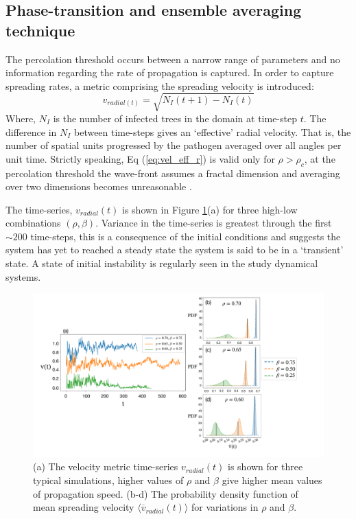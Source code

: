 \subsection{Phase-transition and ensemble averaging technique}

The percolation threshold occurs between a narrow range of parameters and no information regarding the rate of propagation is captured. %
In order to capture spreading rates, a metric comprising the spreading velocity is introduced: %
\begin{equation}
\label{eq:vel_eff_r}
    v_{radial(t)}=\sqrt{N_I(t+1)-N_I(t)}
\end{equation} 
Where, $N_I$ is the number of infected trees in the domain at time-step $t$. %
The difference in $N_I$ between time-steps gives an `effective' radial velocity. %
That is, the number of spatial units progressed by the pathogen averaged over all angles per unit time. %
Strictly speaking, Eq (\ref{eq:vel_eff_r}) is valid only for $\rho > \rho_c$, %
at the percolation threshold the wave-front assumes a fractal dimension and averaging over two dimensions becomes unreasonable \citep[see][for more information]{OROZCOFUENTES201912}. %

The time-series, $v_{radial}(t)$ is shown in Figure \ref{fig:vel_eff_rad_metric}(a) for three high-low combinations $(\rho, \beta)$. %
Variance in the time-series is greatest through the first $\sim 200$ time-steps, %
this is a consequence of the initial conditions and suggests the system has yet to reached a steady state \textemdash %
the system is said to be in a `transient' state. %
A state of initial instability is regularly seen in the study dynamical systems. %

\begin{figure}
    \centering
    \includegraphics[scale=0.26]{chapter3/figures/figure7.pdf}
    \caption{(a) The velocity metric time-series $v_{radial}(t)$ is shown for three typical simulations, higher values of $\rho$ and $\beta$ give higher mean values of propagation speed. (b-d) The probability density function of mean spreading velocity $\big\langle \overline{v}_{radial}(t) \big\rangle$ for variations in $\rho$ and $\beta$.}
    \label{fig:vel_eff_rad_metric}
\end{figure}


